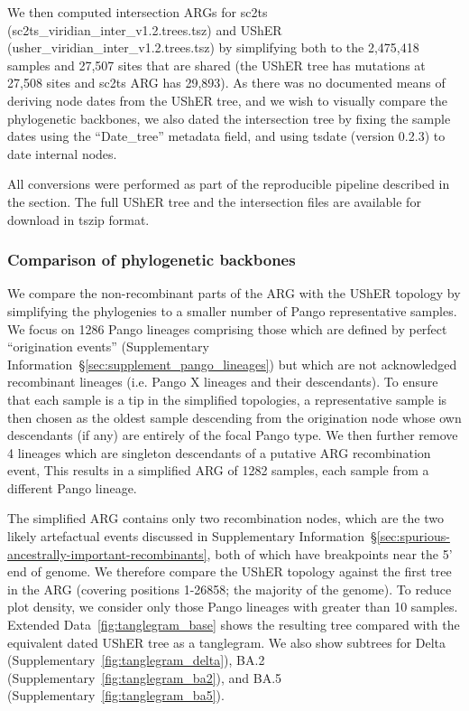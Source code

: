 \documentclass[12pt]{article}
\newcommand{\supref}[1]{Supplementary Information~\S\ref{#1}}
\newcommand{\edref}[1]{Extended Data~\ref{#1}}
\newcommand{\siref}[1]{Supplementary~\ref{#1}}
\begin{document}
We then computed intersection ARGs for
sc2ts (sc2ts\_viridian\_inter\_v1.2.trees.tsz) and
UShER (usher\_viridian\_inter\_v1.2.trees.tsz)
by simplifying \cite{Kelleher2018efficient,Wong2024}
both to the 2,475,418 samples and 27,507 sites that are shared
(the UShER tree has mutations at 27,508 sites and sc2ts ARG has 29,893).
As there was no documented means of deriving node dates from
the UShER tree, and we wish to visually compare
the phylogenetic backbones,
we also dated the intersection tree by fixing
the sample dates using the ``Date\_tree'' metadata field,
and using tsdate (version 0.2.3) to date internal nodes.

All conversions were performed as part of the reproducible
pipeline described in the  section.
The full UShER tree and the intersection files are available for download
in tszip format. %

\subsubsection*{Comparison of phylogenetic backbones}
We compare the non-recombinant parts of the ARG with the UShER topology
by simplifying the phylogenies to a smaller number of
Pango representative samples.
We focus on 1286 Pango lineages comprising those which are defined by perfect ``origination events''
(\supref{sec:supplement_pango_lineages})
but which are not acknowledged recombinant lineages (i.e. Pango X lineages and their descendants).
To ensure that each sample is a tip in the simplified topologies,
a representative sample is then chosen as the oldest sample
descending from the origination node
whose own descendants (if any) are entirely of the focal Pango type.
We then further remove 4 lineages
which are singleton descendants of a putative ARG recombination event,
This results in a simplified ARG of 1282 samples,
each sample from a different Pango lineage.

The simplified ARG contains only two recombination nodes, which
are the two likely artefactual events discussed in
\supref{sec:spurious-ancestrally-important-recombinants},
both of which have breakpoints near the 5' end of genome.
We therefore compare the UShER topology against the first tree in the ARG (covering
positions 1-26858; the majority of the genome). To reduce plot density, we consider
only those Pango lineages with greater than 10 samples.
\edref{fig:tanglegram_base} shows the resulting tree compared with
the equivalent dated UShER tree as a tanglegram.
We also show subtrees for Delta (\siref{fig:tanglegram_delta}),
BA.2 (\siref{fig:tanglegram_ba2}),
and BA.5 (\siref{fig:tanglegram_ba5}).
\end{document}
